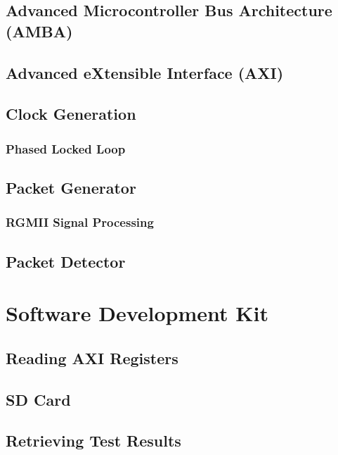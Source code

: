 \subsection{Advanced Microcontroller Bus Architecture (AMBA)}
\subsection{Advanced eXtensible Interface (AXI)}
\subsection{Clock Generation}
\subsubsection{Phased Locked Loop}
\subsection{Packet Generator}
\subsubsection{RGMII Signal Processing}
\subsection{Packet Detector}
\section{Software Development Kit}
\subsection{Reading AXI Registers}
\subsection{SD Card}
\subsection{Retrieving Test Results}
